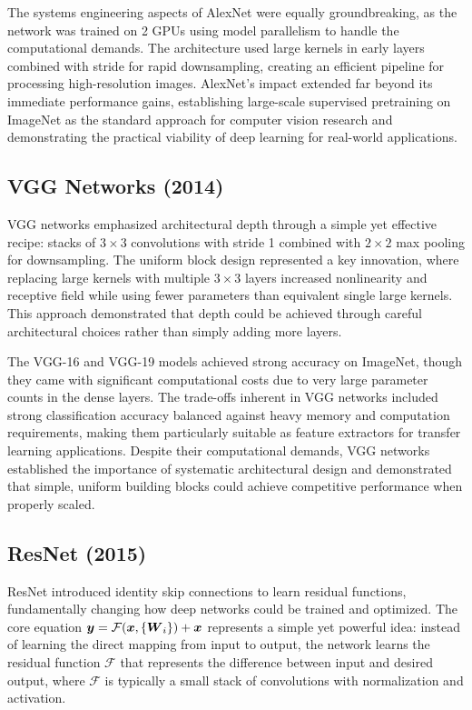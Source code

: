 The systems engineering aspects of AlexNet were equally groundbreaking, as the network was trained on 2 GPUs using model parallelism to handle the computational demands. The architecture used large kernels in early layers combined with stride for rapid downsampling, creating an efficient pipeline for processing high-resolution images. AlexNet's impact extended far beyond its immediate performance gains, establishing large-scale supervised pretraining on ImageNet as the standard approach for computer vision research and demonstrating the practical viability of deep learning for real-world applications.\cite{Krizhevsky2012}

\subsection{VGG Networks (2014)}

VGG networks emphasized architectural depth through a simple yet effective recipe: stacks of $3\times3$ convolutions with stride 1 combined with $2\times2$ max pooling for downsampling. The uniform block design represented a key innovation, where replacing large kernels with multiple $3\times3$ layers increased nonlinearity and receptive field while using fewer parameters than equivalent single large kernels. This approach demonstrated that depth could be achieved through careful architectural choices rather than simply adding more layers.

The VGG-16 and VGG-19 models achieved strong accuracy on ImageNet, though they came with significant computational costs due to very large parameter counts in the dense layers. The trade-offs inherent in VGG networks included strong classification accuracy balanced against heavy memory and computation requirements, making them particularly suitable as feature extractors for transfer learning applications. Despite their computational demands, VGG networks established the importance of systematic architectural design and demonstrated that simple, uniform building blocks could achieve competitive performance when properly scaled.\cite{GoodfellowEtAl2016}

\subsection{ResNet (2015)}
\label{subsec:resnet}

ResNet introduced identity skip connections to learn residual functions, fundamentally changing how deep networks could be trained and optimized. The core equation $\boldsymbol{y} = \mathcal{F}(\boldsymbol{x}, \{\boldsymbol{W}_i\}) + \boldsymbol{x}$ represents a simple yet powerful idea: instead of learning the direct mapping from input to output, the network learns the residual function $\mathcal{F}$ that represents the difference between input and desired output, where $\mathcal{F}$ is typically a small stack of convolutions with normalization and activation.

